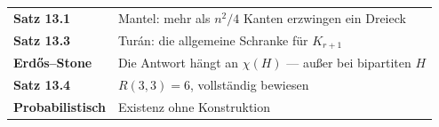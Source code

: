 \begin{merksatz}
\begin{center}
\renewcommand{\arraystretch}{1.5}
\begin{tabular}{@{}P{3.0cm}P{5.6cm}@{}}
\toprule
\textbf{Satz 13.1} & Mantel: mehr als $n^2/4$ Kanten erzwingen ein Dreieck\\
\textbf{Satz 13.3} & Turán: die allgemeine Schranke für $K_{r+1}$\\
\textbf{Erdős--Stone} & Die Antwort hängt an $\chi(H)$ --- außer bei bipartiten $H$\\
\textbf{Satz 13.4} & $R(3,3) = 6$, vollständig bewiesen\\
\textbf{Probabilistisch} & Existenz ohne Konstruktion\\
\bottomrule
\end{tabular}
\end{center}

\begin{center}
\begin{minipage}{0.88\textwidth}
\end{minipage}
\end{center}
\end{merksatz}
